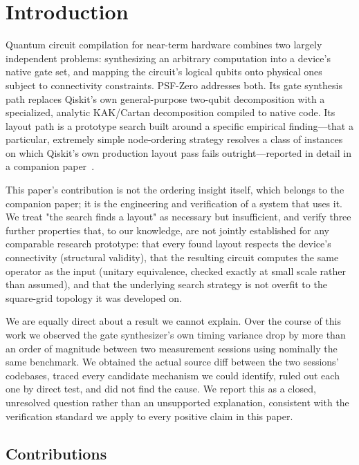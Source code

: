 \documentclass[11pt]{article}
\begin{document}
\section{Introduction}

Quantum circuit compilation for near-term hardware combines two largely
independent problems: synthesizing an arbitrary computation into a
device's native gate set, and mapping the circuit's logical qubits onto
physical ones subject to connectivity constraints. PSF-Zero addresses
both. Its gate synthesis path replaces Qiskit's own general-purpose
two-qubit decomposition with a specialized, analytic KAK/Cartan
decomposition compiled to native code. Its layout path is a prototype
search built around a specific empirical finding---that a particular,
extremely simple node-ordering strategy resolves a class of instances
on which Qiskit's own production layout pass fails outright---reported
in detail in a companion paper~\cite{vf2cliff}.

This paper's contribution is not the ordering insight itself, which
belongs to the companion paper; it is the engineering and verification
of a system that uses it. We treat "the search finds a layout" as
necessary but insufficient, and verify three further properties that,
to our knowledge, are not jointly established for any comparable
research prototype: that every found layout respects the device's
connectivity (structural validity), that the resulting circuit computes
the same operator as the input (unitary equivalence, checked exactly at
small scale rather than assumed), and that the underlying search
strategy is not overfit to the square-grid topology it was developed
on.

We are equally direct about a result we cannot explain. Over the course
of this work we observed the gate synthesizer's own timing variance
drop by more than an order of magnitude between two measurement
sessions using nominally the same benchmark. We obtained the actual
source diff between the two sessions' codebases, traced every
candidate mechanism we could identify, ruled out each one by direct
test, and did not find the cause. We report this as a closed,
unresolved question rather than an unsupported explanation, consistent
with the verification standard we apply to every positive claim in this
paper.

\subsection{Contributions}
\end{document}
